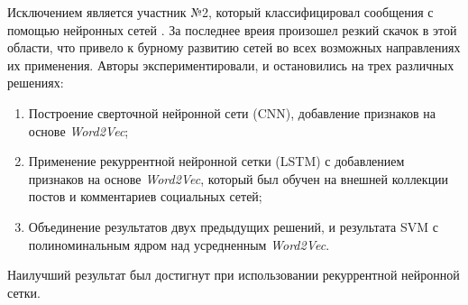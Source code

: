 Исключением является участник №2, который классифицировал сообщения с помощью
нейронных сетей \cite{neuralNetworks}.
За последнее вреия произошел резкий скачок в этой области, что привело
к бурному развитию сетей во всех возможных направлениях их применения.
Авторы экспериментировали, и остановились на трех различных решениях:
\begin{enumerate}
    \item Построение сверточной нейронной сети (CNN), добавление признаков на
        основе {\it Word2Vec};
    \item Применение рекуррентной нейронной сетки (LSTM) с добавлением признаков
        на основе {\it Word2Vec}, который был обучен на внешней коллекции
        постов и комментариев социальных сетей;
    \item Объединение результатов двух предыдущих решений, и результата
        SVM с полиноминальным ядром над усредненным {\it Word2Vec}.
\end{enumerate}


Наилучший результат был достигнут при использовании рекуррентной нейронной сетки.
